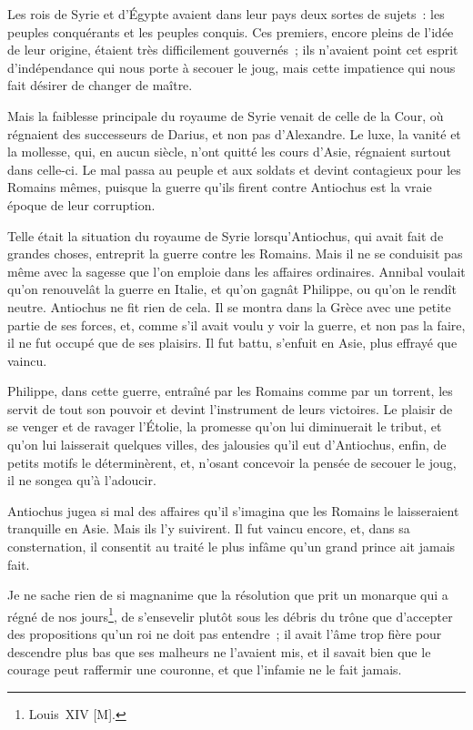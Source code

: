\documentclass[french,twoside]{book} %
\begin{document}
Les rois de Syrie et d’Égypte avaient dans leur pays deux sortes de sujets : les peuples conquérants et les peuples conquis. Ces premiers, encore pleins de l’idée de leur origine, étaient très difficilement gouvernés ; ils n’avaient point cet esprit d’indépendance qui nous porte à secouer le joug, mais cette impatience qui nous fait désirer de changer de maître.\par
Mais la faiblesse principale du royaume de Syrie venait de celle de la Cour, où régnaient des successeurs de Darius, et non pas d’Alexandre. Le luxe, la vanité et la mollesse, qui, en aucun siècle, n’ont quitté les cours d’Asie, régnaient surtout dans celle-ci. Le mal passa au peuple et aux soldats et devint contagieux pour les Romains mêmes, puisque la guerre qu’ils firent contre Antiochus est la vraie époque de leur corruption.\par
Telle était la situation du royaume de Syrie lorsqu’Antiochus, qui avait fait de grandes choses, entreprit la guerre contre les Romains. Mais il ne se conduisit pas même avec la sagesse que l’on emploie dans les affaires ordinaires. Annibal voulait qu’on renouvelât la guerre en Italie, et qu’on gagnât Philippe, ou qu’on le rendît neutre. Antiochus ne fit rien de cela. Il se montra dans la Grèce avec une petite partie de ses forces, et, comme s’il avait voulu y voir la guerre, et non pas la faire, il ne fut occupé que de ses plaisirs. Il fut battu, s’enfuit en Asie, plus effrayé que vaincu.\par
Philippe, dans cette guerre, entraîné par les Romains comme par un torrent, les servit de tout son pouvoir et devint l’instrument de leurs victoires. Le plaisir de se venger et de ravager l’Étolie, la promesse qu’on lui diminuerait le tribut, et qu’on lui laisserait quelques villes, des jalousies qu’il eut d’Antiochus, enfin, de petits motifs le déterminèrent, et, n’osant concevoir la pensée de secouer le joug, il ne songea qu’à l’adoucir.\par
Antiochus jugea si mal des affaires qu’il s’imagina que les Romains le laisseraient tranquille en Asie. Mais ils l’y suivirent. Il fut vaincu encore, et, dans sa consternation, il consentit au traité le plus infâme qu’un grand prince ait jamais fait.\par
Je ne sache rien de si magnanime que la résolution que prit un monarque qui a régné de nos jours\footnote{Louis XIV [M].}, de s’ensevelir plutôt sous les débris du trône que d’accepter des propositions qu’un roi ne doit pas entendre ; il avait l’âme trop fière pour descendre plus bas que ses malheurs ne l’avaient mis, et il savait bien que le courage peut raffermir une couronne, et que l’infamie ne le fait jamais.\par
\end{document}
